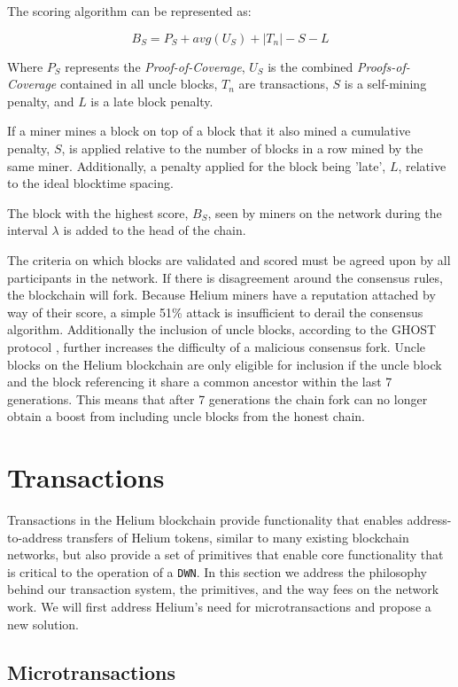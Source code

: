 \documentclass[letterpaper,11pt]{article}
\begin{document}
The scoring algorithm can be represented as:

\[B_S = P_S + avg(U_S) + |T_n|  - S - L \]

Where $P_S$ represents the \emph{Proof-of-Coverage}, $U_S$ is the combined \emph{Proofs-of-Coverage} contained in all uncle blocks, $T_n$ are transactions, $S$ is a self-mining penalty, and $L$ is a late block penalty.

If a miner mines a block on top of a block that it also mined  a cumulative penalty, $S$, is applied relative to the number of blocks in a row mined by the same miner. Additionally, a penalty applied for the block being 'late', $L$, relative to the ideal blocktime spacing.

The block with the highest score, $B_S$, seen by miners on the network during the interval $\lambda$ is added to the head of the chain.

The criteria on which blocks are validated and scored must be agreed upon by all participants in the network. If there is disagreement around the consensus rules, the blockchain will fork. Because Helium miners have a reputation attached by way of their score, a simple 51\% attack is insufficient to derail the consensus algorithm. Additionally the inclusion of uncle blocks, according to the GHOST protocol \cite{ghost}, further increases the difficulty of a malicious consensus fork. Uncle blocks on the Helium blockchain are only eligible for inclusion if the uncle block and the block referencing it share a common ancestor within the last 7 generations. This means that after 7 generations the chain fork can no longer obtain a boost from including uncle blocks from the honest chain.

\section{Transactions}\label{transactions}

Transactions in the Helium blockchain provide functionality that enables address-to-address transfers of Helium tokens, similar to many existing blockchain networks, but also provide a set of primitives that enable core functionality that is critical to the operation of a \verb|DWN|. In this section we address the philosophy behind our transaction system, the primitives, and the way fees on the network work. We will first address Helium's need for microtransactions and propose a new solution.

\subsection{Microtransactions} \label{microtransactions}
\end{document}
